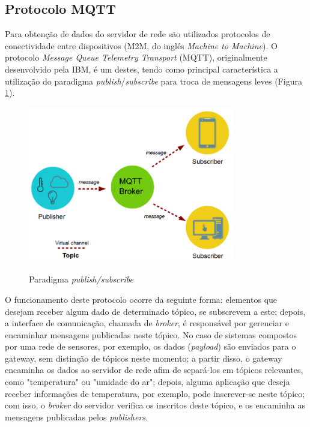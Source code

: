 \documentclass[oneside,openright,12pt]{ufsm_2015} %
\begin{document}
\subsection{Protocolo MQTT}
Para obtenção de dados do servidor de rede são utilizados protocolos de conectividade entre dispositivos (M2M, do inglês \textit{Machine to Machine}). O protocolo \textit{Message Queue Telemetry Transport} (MQTT), originalmente desenvolvido pela IBM, é um destes, tendo como principal característica a utilização do paradigma \textit{publish}/\textit{subscribe} para troca de mensagens leves (Figura \ref{fig:mqtt-topico}).
\begin{figure}[H]
    \caption{\label{exepretex} Paradigma \textit{publish/subscribe}}
    \centering
    \includegraphics[width=0.8\textwidth]{figuras/publish-subscribe.png}
    \vspace{\baselineskip} %
        \label{fig:mqtt-topico}
\end{figure}

O funcionamento deste protocolo ocorre da seguinte forma: elementos que desejam receber algum dado de determinado tópico, se subscrevem a este; depois, a interface de comunicação, chamada de \textit{broker}, é responsável por gerenciar e encaminhar mensagens publicadas neste tópico. No caso de sistemas compostos por uma rede de sensores, por exemplo, os dados (\textit{payload}) são enviados para o gateway, sem distinção de tópicos neste momento; a partir disso, o gateway encaminha os dados ao servidor de rede afim de separá-los em tópicos relevantes, como "temperatura" ou "umidade do ar"; depois, alguma aplicação que deseja receber informações de temperatura, por exemplo, pode inscrever-se neste tópico; com isso, o \textit{broker} do servidor verifica os inscritos deste tópico, e os encaminha as mensagens publicadas pelos \textit{publishers}. 
\end{document}
